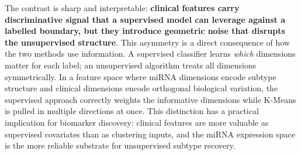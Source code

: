 The contrast is sharp and interpretable: \textbf{clinical features carry
discriminative signal that a supervised model can leverage against a labelled
boundary, but they introduce geometric noise that disrupts the unsupervised
structure}. This asymmetry is a direct consequence of how the two methods use
information. A supervised classifier learns \textit{which} dimensions matter for
each label; an unsupervised algorithm treats all dimensions symmetrically. In a
feature space where miRNA dimensions encode subtype structure and clinical dimensions
encode orthogonal biological variation, the supervised approach correctly weights the
informative dimensions while K-Means is pulled in multiple directions at once. This
distinction has a practical implication for biomarker discovery: clinical features
are more valuable as supervised covariates than as clustering inputs, and the miRNA
expression space is the more reliable substrate for unsupervised subtype recovery.
\FloatBarrier